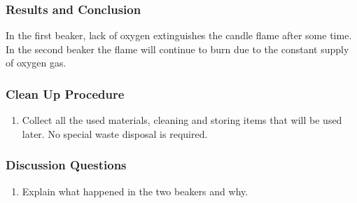 \subsubsection*{Results and Conclusion}
In the first beaker, lack of oxygen extinguishes the candle flame after some time. In the second beaker the flame will continue to burn due to the constant supply of oxygen gas. 

\subsubsection*{Clean Up Procedure}
\begin{enumerate}
\item{Collect all the used materials, cleaning and storing items that will be used later. No special waste disposal is required.}
\end{enumerate}

\subsubsection*{Discussion Questions}
\begin{enumerate}
\item{Explain what happened in the two beakers and why.}
\end{enumerate}






